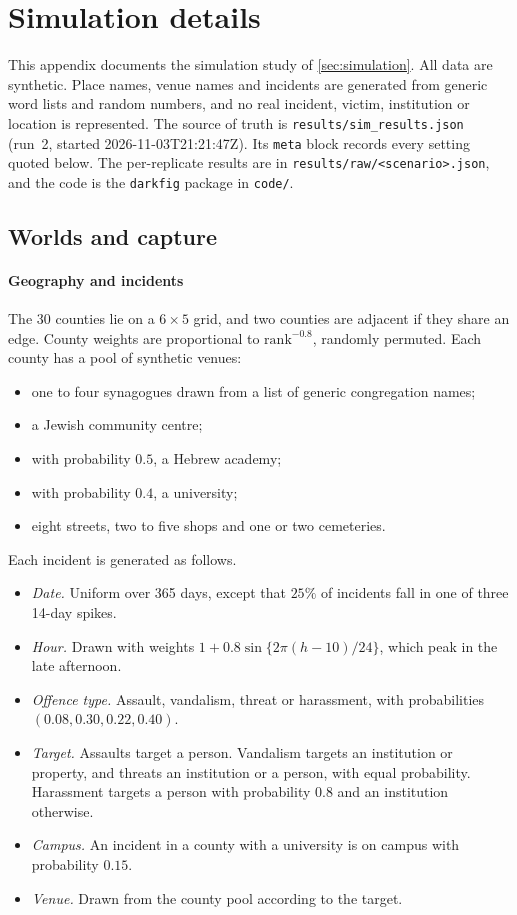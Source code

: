 \section{Simulation details}\label{app:simdetails}

This appendix documents the simulation study of \cref{sec:simulation}. All data are synthetic. Place names, venue names and incidents are generated from generic word lists and random numbers, and no real incident, victim, institution or location is represented. The source of truth is \texttt{results/sim\_results.json} (run~2, started 2026-11-03T21:21:47Z). Its \texttt{meta} block records every setting quoted below. The per-replicate results are in \texttt{results/raw/<scenario>.json}, and the code is the \texttt{darkfig} package in \texttt{code/}.

\subsection{Worlds and capture}\label{app:sim-worlds}

\paragraph{Geography and incidents} The 30 counties lie on a $6\times5$ grid, and two counties are adjacent if they share an edge. County weights are proportional to $\mathrm{rank}^{-0.8}$, randomly permuted. Each county has a pool of synthetic venues:
\begin{itemize}
  \item one to four synagogues drawn from a list of generic congregation names;
  \item a Jewish community centre;
  \item with probability $0.5$, a Hebrew academy;
  \item with probability $0.4$, a university;
  \item eight streets, two to five shops and one or two cemeteries.
\end{itemize}

Each incident is generated as follows.
\begin{itemize}
  \item \emph{Date.} Uniform over 365 days, except that $25\%$ of incidents fall in one of three 14-day spikes.
  \item \emph{Hour.} Drawn with weights $1+0.8\sin\{2\pi(h-10)/24\}$, which peak in the late afternoon.
  \item \emph{Offence type.} Assault, vandalism, threat or harassment, with probabilities $(0.08,0.30,0.22,0.40)$.
  \item \emph{Target.} Assaults target a person. Vandalism targets an institution or property, and threats an institution or a person, with equal probability. Harassment targets a person with probability $0.8$ and an institution otherwise.
  \item \emph{Campus.} An incident in a county with a university is on campus with probability $0.15$.
  \item \emph{Venue.} Drawn from the county pool according to the target.
\end{itemize}


